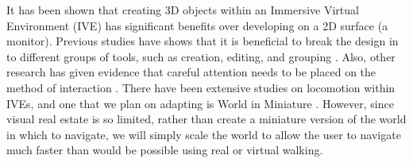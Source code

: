 It has been shown that creating 3D objects within an Immersive Virtual Environment (IVE) has significant benefits over developing on a 2D surface (a monitor)\cite{Kaufmann:LearningGeometry,Kaufmann:Usability}.
Previous studies have shows that it is beneficial to break the design in to different groups of tools, such as creation, editing, and grouping \cite{Butterworth:1992:3DM}.
Also, other research has given evidence that careful attention needs to be placed on the method of interaction \cite{Bowman98interactiontechniques}.
There have been extensive studies on locomotion within IVEs, and one that we plan on adapting is World in Miniature \cite{Pausch:WorldInMiniature}.
However, since visual real estate is so limited, rather than create a miniature version of the world in which to navigate, we will simply scale the world to allow the user to navigate much faster than would be possible using real or virtual walking.

